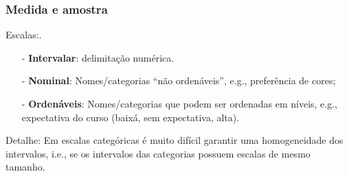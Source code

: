 \documentclass[14pt]{beamer}
\begin{document}
\begin{frame}
\frametitle{Medida e amostra}
	Escalas:.\\
	\begin{itemize}
		\item[-] \textbf{Intervalar}: delimitação numérica.
		\item[-] \textbf{Nominal}: Nomes/categorias ``não ordenáveis'', e.g., preferência de cores;
		\item[-] \textbf{Ordenáveis}: Nomes/categorias que podem ser ordenadas em níveis, e.g., expectativa do curso (baixá, sem expectativa, alta).	
	\end{itemize}
	
	Detalhe: Em escalas categóricas é muito difícil garantir uma homogeneidade dos intervalos, i.e., se os intervalos das categorias possuem escalas de mesmo tamanho.
	
	

\end{frame}
\end{document}
